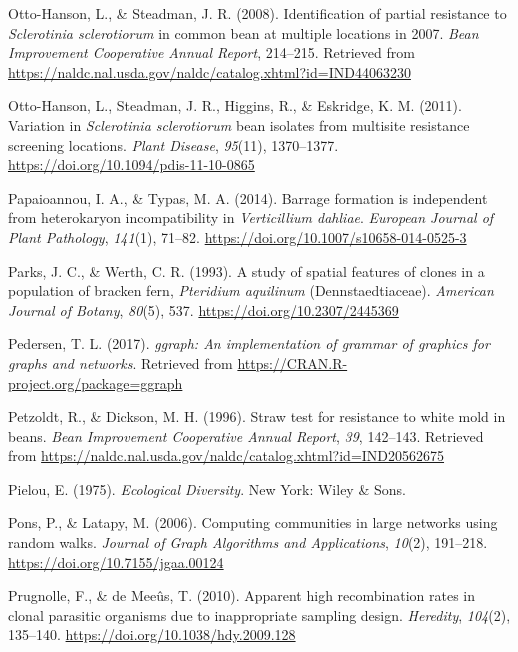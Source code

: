 \hypertarget{ref-otto2008identification}{}
Otto-Hanson, L., \& Steadman, J. R. (2008). Identification of partial
resistance to \emph{Sclerotinia sclerotiorum} in common bean at multiple
locations in 2007. \emph{Bean Improvement Cooperative Annual Report},
214--215. Retrieved from
\url{https://naldc.nal.usda.gov/naldc/catalog.xhtml?id=IND44063230}

\hypertarget{ref-otto-hanson2011variation}{}
Otto-Hanson, L., Steadman, J. R., Higgins, R., \& Eskridge, K. M.
(2011). Variation in \emph{Sclerotinia sclerotiorum} bean isolates from
multisite resistance screening locations. \emph{Plant Disease},
\emph{95}(11), 1370--1377. \url{https://doi.org/10.1094/pdis-11-10-0865}

\hypertarget{ref-papaioannou2014barrage}{}
Papaioannou, I. A., \& Typas, M. A. (2014). Barrage formation is
independent from heterokaryon incompatibility in \emph{Verticillium
dahliae}. \emph{European Journal of Plant Pathology}, \emph{141}(1),
71--82. \url{https://doi.org/10.1007/s10658-014-0525-3}

\hypertarget{ref-parks1993study}{}
Parks, J. C., \& Werth, C. R. (1993). A study of spatial features of
clones in a population of bracken fern, \emph{Pteridium aquilinum}
(Dennstaedtiaceae). \emph{American Journal of Botany}, \emph{80}(5),
537. \url{https://doi.org/10.2307/2445369}

\hypertarget{ref-ggraph}{}
Pedersen, T. L. (2017). \emph{ggraph: An implementation of grammar of
graphics for graphs and networks}. Retrieved from
\url{https://CRAN.R-project.org/package=ggraph}

\hypertarget{ref-petzoldt1996straw}{}
Petzoldt, R., \& Dickson, M. H. (1996). Straw test for resistance to
white mold in beans. \emph{Bean Improvement Cooperative Annual Report},
\emph{39}, 142--143. Retrieved from
\url{https://naldc.nal.usda.gov/naldc/catalog.xhtml?id=IND20562675}

\hypertarget{ref-pielou1975ecological}{}
Pielou, E. (1975). \emph{Ecological Diversity}. New York: Wiley \& Sons.

\hypertarget{ref-pons2006computing}{}
Pons, P., \& Latapy, M. (2006). Computing communities in large networks
using random walks. \emph{Journal of Graph Algorithms and Applications},
\emph{10}(2), 191--218. \url{https://doi.org/10.7155/jgaa.00124}

\hypertarget{ref-prugnolle2010apparent}{}
Prugnolle, F., \& de Meeûs, T. (2010). Apparent high recombination rates
in clonal parasitic organisms due to inappropriate sampling design.
\emph{Heredity}, \emph{104}(2), 135--140.
\url{https://doi.org/10.1038/hdy.2009.128}

